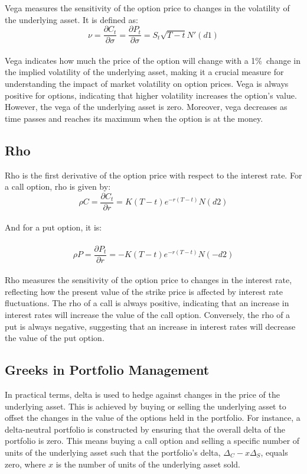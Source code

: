 \documentclass[a4paper,10pt]{article}
\begin{document}
        \noindent Vega measures the sensitivity of the option price to changes in the volatility of the underlying asset. It is defined as:\\\[ \nu = \frac{\partial C_t}{\partial \sigma} = \frac{\partial P_t}{\partial \sigma} = S_t \sqrt{T-t} N'(d1) \]\\ Vega indicates how much the price of the option will change with a 1\%\ change in the implied volatility of the underlying asset, making it a crucial measure for understanding the impact of market volatility on option prices. Vega is always positive for options, indicating that higher volatility increases the option's value. However, the vega of the underlying asset is zero. Moreover, vega decreases as time passes and reaches its maximum when the option is at the money. \\
    
    \subsection*{Rho}    
    
        \noindent Rho is the first derivative of the option price with respect to the interest rate. For a call option, rho is given by:\\\[ \rho C = \frac{\partial C_t}{\partial r} = K (T-t) e^{-r(T-t)} N(d2) \]\\ And for a put option, it is:\\ \\\[ \rho P = \frac{\partial P_t}{\partial r} = -K (T-t) e^{-r(T-t)} N(-d2) \]\\ Rho measures the sensitivity of the option price to changes in the interest rate, reflecting how the present value of the strike price is affected by interest rate fluctuations. The rho of a call is always positive, indicating that an increase in interest rates will increase the value of the call option. Conversely, the rho of a put is always negative, suggesting that an increase in interest rates will decrease the value of the put option. \\
    
    \subsection*{Greeks in Portfolio Management} 
    
        \noindent In practical terms, delta is used to hedge against changes in the price of the underlying asset. This is achieved by buying or selling the underlying asset to offset the changes in the value of the options held in the portfolio. For instance, a delta-neutral portfolio is constructed by ensuring that the overall delta of the portfolio is zero. This means buying a call option and selling a specific number of units of the underlying asset such that the portfolio’s delta, \(\Delta_C - x \Delta_S\), equals zero, where \(x\) is the number of units of the underlying asset sold. \\
        
\end{document}
